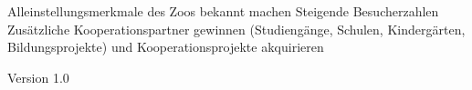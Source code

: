 %
{}{Alleinstellungsmerkmale des Zoos bekannt machen \newline Steigende Besucherzahlen \newline Zusätzliche Kooperationspartner gewinnen (Studien\-gänge, Schulen, Kindergärten, Bildungsprojekte) und Koopera\-tions\-projekte akquirieren
\begin{flushright}
	\textnormal{\textsf{\footnotesize{Version 1.0}}}
\end{flushright}
}%
{}{}%
{}%